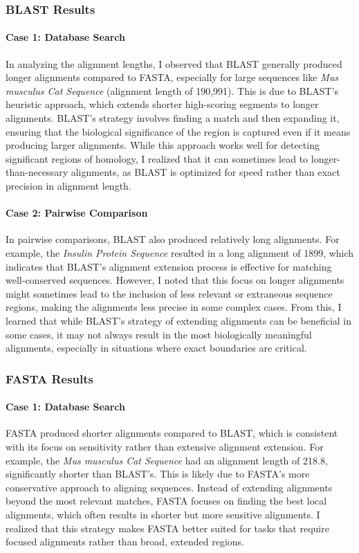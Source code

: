 \documentclass{article}
\begin{document}
\subsubsection{ BLAST Results}

\paragraph{Case 1: Database Search}
In analyzing the alignment lengths, I observed that BLAST generally produced longer alignments compared to FASTA, especially for large sequences like \textit{Mus musculus Cat Sequence} (alignment length of 190,991). This is due to BLAST’s heuristic approach, which extends shorter high-scoring segments to longer alignments. BLAST’s strategy involves finding a match and then expanding it, ensuring that the biological significance of the region is captured even if it means producing larger alignments. While this approach works well for detecting significant regions of homology, I realized that it can sometimes lead to longer-than-necessary alignments, as BLAST is optimized for speed rather than exact precision in alignment length.

\paragraph{Case 2: Pairwise Comparison}
In pairwise comparisons, BLAST also produced relatively long alignments. For example, the \textit{Insulin Protein Sequence} resulted in a long alignment of 1899, which indicates that BLAST’s alignment extension process is effective for matching well-conserved sequences. However, I noted that this focus on longer alignments might sometimes lead to the inclusion of less relevant or extraneous sequence regions, making the alignments less precise in some complex cases. From this, I learned that while BLAST’s strategy of extending alignments can be beneficial in some cases, it may not always result in the most biologically meaningful alignments, especially in situations where exact boundaries are critical.

\subsubsection{ FASTA Results}

\paragraph{Case 1: Database Search}
FASTA produced shorter alignments compared to BLAST, which is consistent with its focus on sensitivity rather than extensive alignment extension. For example, the \textit{Mus musculus Cat Sequence} had an alignment length of 218.8, significantly shorter than BLAST’s. This is likely due to FASTA’s more conservative approach to aligning sequences. Instead of extending alignments beyond the most relevant matches, FASTA focuses on finding the best local alignments, which often results in shorter but more sensitive alignments. I realized that this strategy makes FASTA better suited for tasks that require focused alignments rather than broad, extended regions.
\end{document}
